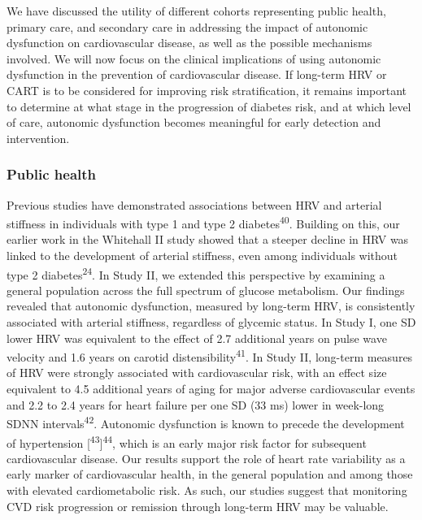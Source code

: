 \documentclass[
  a4paper,
  headsepline=true,
  open=any]{scrbook}
\begin{document}
We have discussed the utility of different cohorts representing public
health, primary care, and secondary care in addressing the impact of
autonomic dysfunction on cardiovascular disease, as well as the possible
mechanisms involved. We will now focus on the clinical implications of
using autonomic dysfunction in the prevention of cardiovascular disease.
If long-term HRV or CART is to be considered for improving risk
stratification, it remains important to determine at what stage in the
progression of diabetes risk, and at which level of care, autonomic
dysfunction becomes meaningful for early detection and intervention.

\hypertarget{public-health}{%
\subsubsection{Public health}\label{public-health}}

Previous studies have demonstrated associations between HRV and arterial
stiffness in individuals with type 1 and type 2
diabetes\textsuperscript{40}. Building on this, our earlier work in the
Whitehall II study showed that a steeper decline in HRV was linked to
the development of arterial stiffness, even among individuals without
type 2 diabetes\textsuperscript{24}. In Study II, we extended this
perspective by examining a general population across the full spectrum
of glucose metabolism. Our findings revealed that autonomic dysfunction,
measured by long-term HRV, is consistently associated with arterial
stiffness, regardless of glycemic status. In Study I, one SD lower HRV
was equivalent to the effect of 2.7 additional years on pulse wave
velocity and 1.6 years on carotid distensibility\textsuperscript{41}. In
Study II, long-term measures of HRV were strongly associated with
cardiovascular risk, with an effect size equivalent to 4.5 additional
years of aging for major adverse cardiovascular events and 2.2 to 2.4
years for heart failure per one SD (33 ms) lower in week-long SDNN
intervals\textsuperscript{42}. Autonomic dysfunction is known to precede
the development of hypertension
{[}\textsuperscript{43}{]}\textsuperscript{44}, which is an early major
risk factor for subsequent cardiovascular disease. Our results support
the role of heart rate variability as a early marker of cardiovascular
health, in the general population and among those with elevated
cardiometabolic risk. As such, our studies suggest that monitoring CVD
risk progression or remission through long-term HRV may be valuable.
\end{document}
